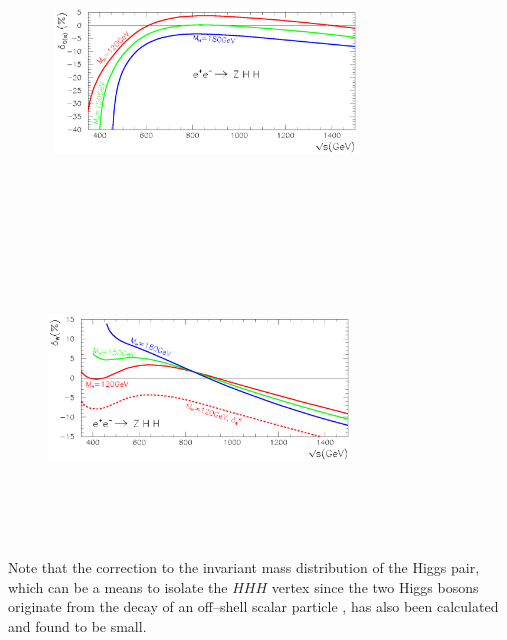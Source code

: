 {\begin{figure}[!h]
\begin{center}
\mbox{
\includegraphics[width=8cm,height=8cm]{./sm4/delalpharc.eps}
\includegraphics[width=8cm,height=8cm]{./sm4/delwrc.eps}}
\end{center}
\vspace*{-6mm}
\vspace*{-5mm}
\end{figure}

Note that the correction to the invariant mass distribution of the Higgs pair,
which can be a means to isolate the $HHH$ vertex since the two Higgs bosons 
originate from the decay of an off--shell scalar particle \cite{gam-WWHH},
has also been calculated and found to be small. 


}
